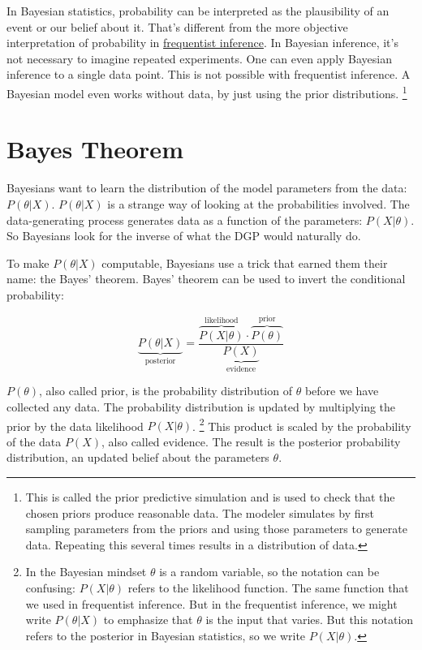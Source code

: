 \documentclass[
  10pt,
]{scrbook}
\begin{document}
In Bayesian statistics, probability can be interpreted as the plausibility of an event or our belief about it.
That's different from the more objective interpretation of probability in \protect\hyperlink{frequentist-inference}{frequentist inference}.
In Bayesian inference, it's not necessary to imagine repeated experiments.
One can even apply Bayesian inference to a single data point.
This is not possible with frequentist inference.
A Bayesian model even works without data, by just using the prior distributions. \footnote{This is called the prior predictive simulation and is used to check that the chosen priors produce reasonable data. The modeler simulates by first sampling parameters from the priors and using those parameters to generate data. Repeating this several times results in a distribution of data.}

\hypertarget{bayes-theorem}{%
\section{Bayes Theorem}\label{bayes-theorem}}

Bayesians want to learn the distribution of the model parameters from the data: \(P(\theta | X)\).
\(P(\theta | X)\) is a strange way of looking at the probabilities involved.
The data-generating process generates data as a function of the parameters: \(P(X | \theta)\).
So Bayesians look for the inverse of what the DGP would naturally do.

To make \(P(\theta|X)\) computable, Bayesians use a trick that earned them their name: the Bayes' theorem.
Bayes' theorem can be used to invert the conditional probability:

\[\underbrace{P(\theta|X)}_{\text{posterior}} = \frac{\overbrace{P(X | \theta)}^{\text{likelihood}} \cdot  \overbrace{P(\theta)}^{\text{prior}}}{\underbrace{P(X)}_{\text{evidence}}}\]

\(P(\theta)\), also called prior, is the probability distribution of \(\theta\) before we have collected any data.
The probability distribution is updated by multiplying the prior by the data likelihood \(P(X | \theta)\). \footnote{In the Bayesian mindset \(\theta\) is a random variable, so the notation can be confusing: \(P(X | \theta)\) refers to the likelihood function. The same function that we used in frequentist inference. But in the frequentist inference, we might write \(P(\theta | X)\) to emphasize that \(\theta\) is the input that varies. But this notation refers to the posterior in Bayesian statistics, so we write \(P(X | \theta)\).}
This product is scaled by the probability of the data \(P(X)\), also called evidence.
The result is the posterior probability distribution, an updated belief about the parameters \(\theta\).
\end{document}
